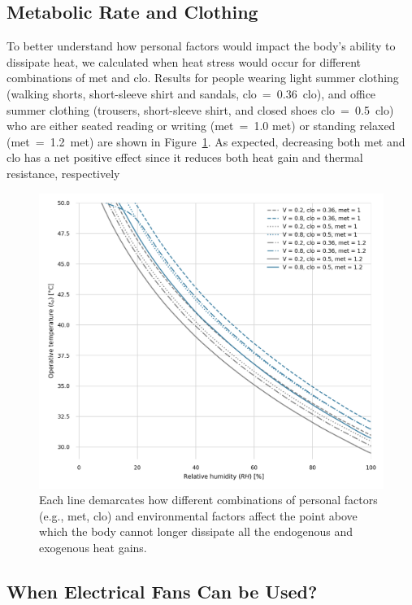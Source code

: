 \subsection{Metabolic Rate and Clothing}\label{subsec:met-clo}

To better understand how personal factors would impact the body's ability to dissipate heat, we calculated when heat stress would occur for different combinations of \ac{met} and \ac{clo}.
Results for people wearing light summer clothing (walking shorts, short-sleeve shirt and sandals, \acs{clo}~=~0.36~clo), and office summer clothing (trousers, short-sleeve shirt, and closed shoes \acs{clo}~=~0.5~clo) who are either seated reading or writing (\ac{met}~=~1.0 met) or standing relaxed (\ac{met}~=~1.2~met) are shown in Figure~\ref{fig:met_clo}.
As expected, decreasing both \ac{met} and \ac{clo} has a net positive effect since it reduces both heat gain and thermal resistance, respectively

\begin{figure}[thb!]
    \centering
    \includegraphics[width=\textwidth]{figures/met_clo}
    \caption{Each line demarcates how different combinations of personal factors (e.g., \ac{met}, \ac{clo}) and environmental factors affect the point above which the body cannot longer dissipate all the endogenous and exogenous heat gains.}
    \label{fig:met_clo}
\end{figure}

\subsection{When Electrical Fans Can be Used?}\label{subsec:use-fans}

